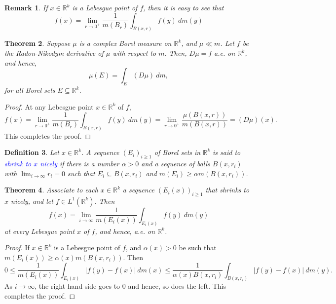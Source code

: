 \documentclass[12pt]{article}
\theoremstyle{thmstyle}
\newtheorem{theorem}{Theorem}[section]
\theoremstyle{defstyle}
\newtheorem{definition}[theorem]{Definition}
\newtheorem{remark}[theorem]{Remark}
\newcommand{\R}{\mathbb{R}}
\newcommand{\define}[1]{\textcolor{blue}{\textit{#1}}}
\renewcommand{\le}{\leqslant}
\renewcommand{\ge}{\geqslant}
\begin{document}
\begin{remark}
    If $x\in\R^k$ is a Lebesgue point of $f$, then it is easy to see that 
    \begin{equation*}
        f(x) = \lim_{r\to0^+}\frac{1}{m(B_r)}\int_{B(x, r)}f(y)~dm(y)
    \end{equation*}
\end{remark}

\begin{theorem}
    Suppose $\mu$ is a complex Borel measure on $\R^k$, and $\mu\ll m$. Let $f$ be the Radon-Nikodym derivative of $\mu$ with respect to $m$. Then, $D\mu = f$ a.e. on $\R^k$, and hence, 
    \begin{equation*}
        \mu(E) = \int_E (D\mu)~dm,
    \end{equation*}
    for all Borel sets $E\subseteq\R^k$.
\end{theorem}
\begin{proof}
    At any Lebesgue point $x\in\R^k$ of $f$, 
    \begin{equation*}
        f(x) = \lim_{r\to 0^+}\frac{1}{m(B_r)}\int_{B(x, r)}f(y)~dm(y) = \lim_{r\to 0^+}\frac{\mu(B(x, r))}{m(B(x, r))} = (D\mu)(x).
    \end{equation*}
    This completes the proof.
\end{proof}

\begin{definition}
    Let $x\in\R^k$. A sequence $(E_i)_{i\ge 1}$ of Borel sets in $\R^k$ is said to \define{shrink to $x$ nicely} if there is a number $\alpha > 0$ and a sequence of balls $B(x, r_i)$ with $\displaystyle\lim_{i\to\infty}r_i = 0$ such that $E_i\subseteq B(x, r_i)$ and $m(E_i)\ge\alpha m(B(x, r_i))$.
\end{definition}

\begin{theorem}
    Associate to each $x\in\R^k$ a sequence $(E_i(x))_{i\ge 1}$ that shrinks to $x$ nicely, and let $f\in L^1(\R^k)$. Then 
    \begin{equation*}
        f(x) = \lim_{i\to\infty}\frac{1}{m(E_i(x))}\int_{E_i(x)}f(y)~dm(y)
    \end{equation*}
    at every Lebesgue point $x$ of $f$, and hence, a.e. on $\R^k$.
\end{theorem}
\begin{proof}
    If $x\in\R^k$ is a Lebesgue point of $f$, and $\alpha(x) > 0$ be such that $m(E_i(x))\ge\alpha(x)m(B(x, r_i))$. Then 
    \begin{equation*}
        0\le\frac{1}{m(E_i(x))}\int_{E_i(x)}|f(y) - f(x)|~dm(x)\le\frac{1}{\alpha(x)B(x, r_i)}\int_{B(x, r_i)}|f(y) - f(x)|~dm(y).
    \end{equation*}
    As $i\to\infty$, the right hand side goes to $0$ and hence, so does the left. This completes the proof.
\end{proof}
\end{document}

